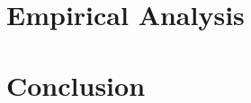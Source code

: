 \documentclass[12pt,twoside]{report}
\newcommand{\mcite}[1]{\textcolor{mycolor}{\citeauthor{#1} (\citeyear{#1})}}
\newcommand{\hcite}[1]{(\textcolor{mycolor}{\citeauthor{#1}, \citeyear{#1}})}
\begin{document}
    \chapter{Empirical Analysis}
    
    
    \chapter{Conclusion}
    
    
    
    
    \vspace{2.0cm}

    \appendix
    \chapter{}
    
    
    \chapter{}
    
    
    \chapter{}
    
\end{document}
